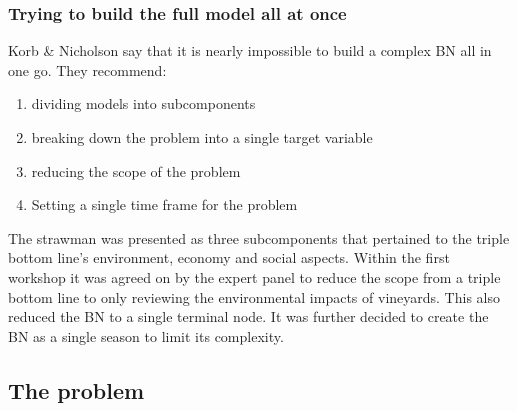 \subsubsection{Trying to build the full model all at once}

Korb & Nicholson say that it is nearly impossible to build a complex BN all in one go. They recommend:
\begin{enumerate}
        \item dividing models into subcomponents
        \item breaking down the problem into a single target variable
        \item reducing the scope of the problem
        \item Setting a single time frame for the problem
\end{enumerate}
The strawman was presented as three subcomponents that pertained to the triple bottom line's environment, economy and social aspects.
Within the first workshop it was agreed on by the expert panel to reduce the scope from a triple bottom line to only reviewing the environmental impacts of vineyards. This also reduced the BN to a single terminal node. It was further decided to create the BN as a single season to limit its complexity.

\subsection{The problem}
